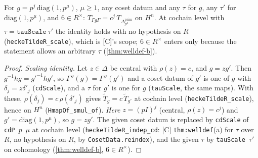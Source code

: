 \begin{proposition}\label{prop:fullassembly-model}
  \leanok
  For $g=p^j\,\mathrm{diag}(1,p^\mu)$, $\mu\ge1$, any coset datum and any $\tau$ for $g$, any $\tau'$ for
  $\mathrm{diag}(1,p^\mu)$, and $6\in R^\times$: $T_{\Gamma g\Gamma}=c^j\,T_{\Delta^{\mathrm{prim}}_{p^\mu}}$ on $H^n$.
  At cochain level with $\tau=\texttt{tauScale}~\tau'$ the identity holds with no hypothesis on $R$
  (\texttt{heckeTildeR\_scale}), which is [C]'s scope; $6\in R^\times$ enters only because the statement allows an arbitrary
  $\tau$ (\ref{thm:welldef-b}).
\end{proposition}
\begin{proof}
  \leanok
  \emph{Scaling identity.} Let $z\in\Delta$ be central with $\rho(z)=c$, and $g=zg'$. Then $g^{-1}hg=g'^{-1}hg'$, so
  $\Gamma''(g)=\Gamma''(g')$ and a coset datum of $g'$ is one of $g$ with $\delta_j=z\delta'_j$ (\texttt{cdScale}), and a $\tau$ for
  $g'$ is one for $g$ (\texttt{tauScale}, the same maps). With these, $\rho(\delta_j)=c\,\rho(\delta'_j)$ gives
  $\widetilde T_g=c\,\widetilde T_{g'}$ at cochain level (\texttt{heckeTildeR\_scale}), hence on $H^n$
  (\texttt{HmapOf\_smul\_of}).
  \emph{Here} $z=(pI)^j$ (central, $\rho(z)=c^j$) and $g'=\mathrm{diag}(1,p^\mu)$, so $g=zg'$. The given coset datum is replaced by
  \texttt{cdScale} of \texttt{cdP}~$p$~$\mu$ at cochain level (\texttt{heckeTildeR\_indep\_cd}: [C] \texttt{thm:welldef}(a) for
  $\tau$ over $R$, no hypothesis on $R$, by \texttt{CosetData.reindex}), and the given $\tau$ by \texttt{tauScale}~$\tau'$ on
  cohomology (\ref{thm:welldef-b}, $6\in R^\times$).
\end{proof}

